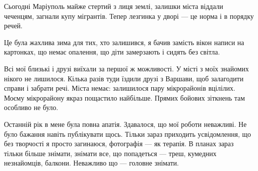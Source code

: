 Сьогодні Маріуполь майже стертий з лиця землі, залишки міста віддали чеченцям,
загнали купу мігрантів. Тепер лезгинка у дворі — це норма і в порядку речей.

Це була жахлива зима для тих, хто залишився, я бачив замість вікон написи на
картонках, що немає опалення, що діти замерзають і сидять без світла.


Всі мої близькі і друзі виїхали за першої ж можливості. У місті з моїх знайомих
нікого не лишилося. Кілька разів туди їздили друзі з Варшави, щоб залагодити
справи і забрати речі. Міста немає: залишилося пару мікрорайонів вцілілих.
Моєму мікрорайону якраз пощастило найбільше. Прямих бойових зіткнень там
особливо не було.

Останній рік в мене була повна апатія. Здавалося, що мої роботи неважливі. Не
було бажання навіть публікувати щось. Тільки зараз приходить усвідомлення, що
без творчості я просто загинаюся, фотографія — як терапія. В планах зараз
тільки більше знімати, знімати все, що попадеться — треш, кумедних незнайомців,
балкони. Неважливо що — головне знімати.

